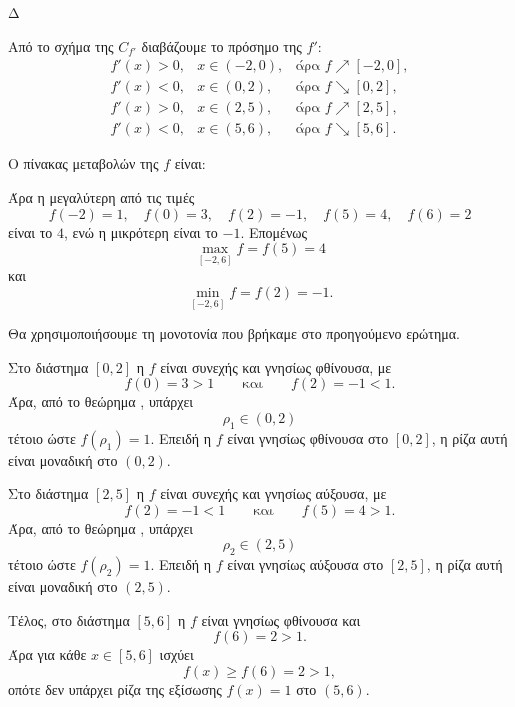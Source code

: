 \begin{thema}{Δ}
\begin{erwthma}
\item Από το σχήμα της $C_{f'}$ διαβάζουμε το πρόσημο της $f'$:
\[
\begin{array}{lll}
f'(x)>0, & x\in(-2,0), & \text{άρα } f\nearrow[-2,0],\\
f'(x)<0, & x\in(0,2),  & \text{άρα } f\searrow[0,2],\\
f'(x)>0, & x\in(2,5),  & \text{άρα } f\nearrow[2,5],\\
f'(x)<0, & x\in(5,6),  & \text{άρα } f\searrow[5,6].
\end{array}
\]

Ο πίνακας μεταβολών της $f$ είναι:
\begin{center}
\end{center}

Άρα η μεγαλύτερη από τις τιμές
\[
f(-2)=1,\quad f(0)=3,\quad f(2)=-1,\quad f(5)=4,\quad f(6)=2
\]
είναι το $4$, ενώ η μικρότερη είναι το $-1$. Επομένως
\[
{\max_{[-2,6]} f=f(5)=4}
\]
και
\[
{\min_{[-2,6]} f=f(2)=-1}.
\]

\item Θα χρησιμοποιήσουμε τη μονοτονία που βρήκαμε στο προηγούμενο
ερώτημα.

Στο διάστημα $[0,2]$ η $f$ είναι συνεχής και γνησίως φθίνουσα, με
\[
f(0)=3>1
\qquad\text{και}\qquad
f(2)=-1<1.
\]
Άρα, από το θεώρημα , υπάρχει
\[
\rho_1\in(0,2)
\]
τέτοιο ώστε $f(\rho_1)=1$. Επειδή η $f$ είναι γνησίως φθίνουσα στο
$[0,2]$, η ρίζα αυτή είναι μοναδική στο $(0,2)$.

Στο διάστημα $[2,5]$ η $f$ είναι συνεχής και γνησίως αύξουσα, με
\[
f(2)=-1<1
\qquad\text{και}\qquad
f(5)=4>1.
\]
Άρα, από το θεώρημα , υπάρχει
\[
\rho_2\in(2,5)
\]
τέτοιο ώστε $f(\rho_2)=1$. Επειδή η $f$ είναι γνησίως αύξουσα στο
$[2,5]$, η ρίζα αυτή είναι μοναδική στο $(2,5)$.

Τέλος, στο διάστημα $[5,6]$ η $f$ είναι γνησίως φθίνουσα και
\[
f(6)=2>1.
\]
Άρα για κάθε $x\in[5,6]$ ισχύει
\[
f(x)\geq f(6)=2>1,
\]
οπότε δεν υπάρχει ρίζα της εξίσωσης $f(x)=1$ στο $(5,6)$.


\end{erwthma}
\end{thema}

